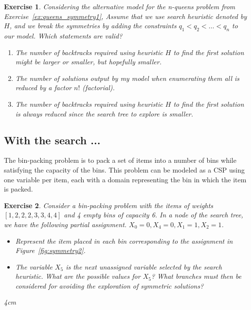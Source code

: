 \documentclass{article}
\newtheorem{exercise}{Exercise}[section]
\begin{document}
    \begin{exercise}
        Considering the alternative model for the n-queens problem from Exercise~\ref{ex:queens_symmetry1},
        Assume that we use search heuristic denoted by $H$, and we break the symmetries by adding the constraints
        $q_1<q_2< \ldots <q_n$ to our model.
        Which statements are valid?
        \begin{enumerate}
            \item The number of backtracks required using heuristic $H$ to find the first solution might be larger or smaller, but hopefully smaller.
            \item The number of solutions output by my model when enumerating them all is reduced by a factor $n!$ (factorial).
            \item The number of backtracks required using heuristic $H$ to find the first solution is always reduced since the search tree to explore is smaller.
        \end{enumerate}
        \label{ex:queens_symmetry2}
    \end{exercise}

    \subsection{With the search ...}

    The bin-packing problem is to pack a set of items into a number of bins while satisfying the capacity of the bins.
    This problem can be modeled as a CSP using one variable per item, each with a domain representing the bin in which the item is packed.


    \begin{exercise}
        Consider a bin-packing problem with the items of weights $[1,2,2,2,3,3,4,4]$ and 4 empty bins of capacity 6.
        In a node of the search tree, we have the following partial assignment.
        $X_0=0,X_4=0,X_1=1,X_2=1$.
        \begin{itemize}
            \item  Represent the item placed in each bin corresponding to the assignment in Figure~\ref{fig:symmetry2}.
            \item  The variable $X_5$ is the next unassigned variable selected by the search heuristic.
                   What are the possible values for $X_5$? What branches must then be considered for avoiding the exploration of symmetric solutions?
        \end{itemize}
        \begin{answerbox}[title=Answer]{4cm}
        \end{answerbox}
        \label{symmetry2}
    \end{exercise}
\end{document}

